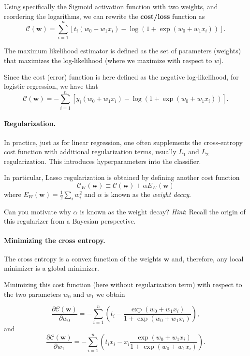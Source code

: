 \documentclass[%
oneside,                 %
final,                   %
10pt]{article}
\newenvironment{question_mdfboxadmon}[1][]{
\begin{question_mdfboxmdframed}[frametitle=#1]
}
{
\end{question_mdfboxmdframed}
}
\begin{document}
Using specifically the Sigmoid activation function with two weights, and reordering the logarithms, we can rewrite the \textbf{cost/loss} function as
\[
\mathcal{C}(\boldsymbol{w}) = \sum_{i=1}^n  \left[ t_i(w_0+w_1 x_i) -\log{(1+\exp{(w_0+w_1x_i)})} \right].
\]

The maximum likelihood estimator is defined as the set of parameters (weights) that maximizes the log-likelihood (where we maximize with respect to $w$).

Since the cost (error) function is here defined as the negative log-likelihood, for logistic regression, we have that
\[
\mathcal{C}(\boldsymbol{w})=-\sum_{i=1}^n  \left[ y_i (w_0+w_1x_i) -\log{ \left( 1+\exp{(w_0+w_1x_i)} \right) } \right].
\]

\paragraph{Regularization.}
In practice, just as for linear regression, one often supplements the cross-entropy cost function with additional regularization terms, usually $L_1$ and $L_2$ regularization. This introduces hyperparameters into the classifier.

In particular, Lasso regularization is obtained by defining another cost function
\[
\mathcal{C}_W (\boldsymbol{w}) \equiv \mathcal{C} (\boldsymbol{w}) + \alpha E_W (\boldsymbol{w})
\]
where $E_W (\boldsymbol{w}) = \frac{1}{2} \sum_i w_i^2$ and $\alpha$ is known as the \emph{weight decay}.


\begin{question_mdfboxadmon}[Question]
Can you motivate why $\alpha$ is known as the weight decay? \emph{Hint}: Recall the origin of this regularizer from a Bayesian perspective.
\end{question_mdfboxadmon} %




\paragraph{Minimizing the cross entropy.}
The cross entropy is a convex function of the weights $\boldsymbol{w}$ and,
therefore, any local minimizer is a global minimizer. 


Minimizing this cost function (here without regularization term) with respect to the two parameters $w_0$ and $w_1$ we obtain

\[
\frac{\partial \mathcal{C}(\boldsymbol{w})}{\partial w_0} = -\sum_{i=1}^n  \left(t_i -\frac{\exp{(w_0+w_1x_i)}}{1+\exp{(w_0+w_1x_i)}}\right),
\]
and 
\[
\frac{\partial \mathcal{C}(\boldsymbol{w})}{\partial w_1} = -\sum_{i=1}^n  \left(t_i x_i -x_i\frac{\exp{(w_0+w_1x_i)}}{1+\exp{(w_0+w_1x_i)}}\right).
\]
\end{document}
